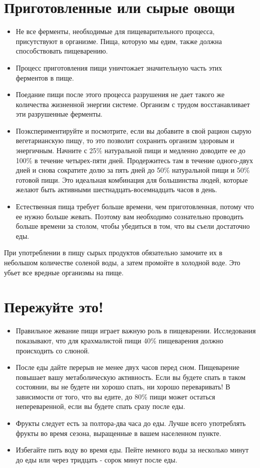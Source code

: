 \section{Приготовленные или сырые овощи}
\begin{itemize}
\item Не все ферменты, необходимые для пищеварительного процесса, присутствуют в организме. Пища, которую мы едим, также должна способствовать пищеварению.
\item Процесс приготовления пищи уничтожает значительную часть этих ферментов в пище.
\item Поедание пищи после этого процесса разрушения не дает такого же количества жизненной энергии системе. Организм с трудом восстанавливает эти разрушенные ферменты.
\item Поэкспериментируйте и посмотрите, если вы добавите в свой рацион сырую вегетарианскую пищу, то это позволит сохранить организм здоровым и энергичным. Начните с 25\% натуральной пищи и медленно доводите ее до 100\% в течение четырех-пяти дней. Продержитесь там в течение одного-двух дней и снова сократите долю за пять дней до 50\% натуральной пищи и 50\% готовой пищи. Это идеальная комбинация для большинства людей, которые желают быть активными шестнадцать-восемнадцать часов в день.
\item Естественная пища требует больше времени, чем приготовленная, потому что ее нужно больше жевать. Поэтому вам необходимо сознательно проводить больше времени за столом, чтобы убедиться в том, что вы съели достаточно еды.
\end{itemize}

\begin{KeepInMind}
При употреблении в пищу сырых продуктов обязательно замочите их в небольшом количестве соленой воды, а затем промойте в холодной воде. Это убьет все вредные организмы на пище.
\end{KeepInMind}

\section{Пережуйте это!}
\begin{itemize}
\item Правильное жевание пищи играет важную роль в пищеварении. Исследования показывают, что для крахмалистой пищи 40\% пищеварения должно происходить со слюной.
\item После еды дайте перерыв не менее двух часов перед сном. Пищеварение повышает вашу метаболическую активность. Если вы будете спать в таком состоянии, вы не будете ни хорошо спать, ни хорошо переваривать! В зависимости от того, что вы едите, до 80\% пищи может остаться непереваренной, если вы будете спать сразу после еды.
\item Фрукты следует есть за полтора-два часа до еды. Лучше всего употреблять фрукты во время сезона, выращенные в вашем населенном пункте.
\item  Избегайте пить воду во время еды. Пейте немного воды за несколько минут до еды или через тридцать - сорок минут после еды.
\end{itemize}

